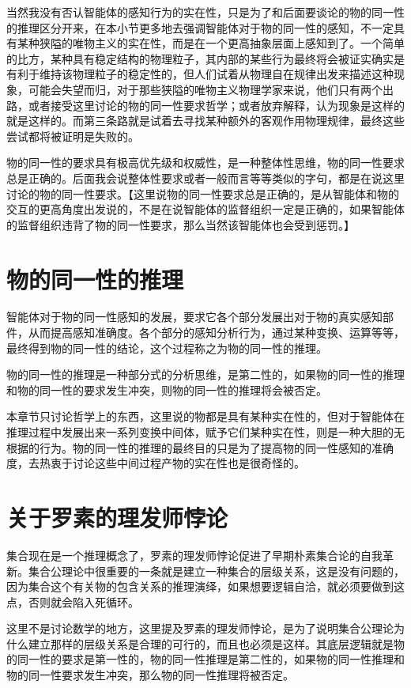 \documentclass[12pt,oneside]{book}
\begin{document}
当然我没有否认智能体的感知行为的实在性，只是为了和后面要谈论的物的同一性的推理区分开来，在本小节更多地去强调智能体对于物的同一性的感知，不一定具有某种狭隘的唯物主义的实在性，而是在一个更高抽象层面上感知到了。一个简单的比方，某种具有稳定结构的物理粒子，其内部的某些行为最终将会被证实确实是有利于维持该物理粒子的稳定性的，但人们试着从物理自在规律出发来描述这种现象，可能会失望而归，对于那些狭隘的唯物主义物理学家来说，他们只有两个出路，或者接受这里讨论的物的同一性要求哲学；或者放弃解释，认为现象是这样的就是这样的。而第三条路就是试着去寻找某种额外的客观作用物理规律，最终这些尝试都将被证明是失败的。

物的同一性的要求具有极高优先级和权威性，是一种整体性思维，物的同一性要求总是正确的。后面我会说整体性要求或者一般而言等等类似的字句，都是在说这里讨论的物的同一性要求。【这里说物的同一性要求总是正确的，是从智能体和物的交互的更高角度出发说的，不是在说智能体的监督组织一定是正确的，如果智能体的监督组织违背了物的同一性要求，那么当然该智能体也会受到惩罚。】


\section{物的同一性的推理}
智能体对于物的同一性感知的发展，要求它各个部分发展出对于物的真实感知部件，从而提高感知准确度。各个部分的感知分析行为，通过某种变换、运算等等，最终得到物的同一性的结论，这个过程称之为物的同一性的推理。

物的同一性的推理是一种部分式的分析思维，是第二性的，如果物的同一性的推理和物的同一性的要求发生冲突，则物的同一性的推理将会被否定。

本章节只讨论哲学上的东西，这里说的物都是具有某种实在性的，但对于智能体在推理过程中发展出来一系列变换中间体，赋予它们某种实在性，则是一种大胆的无根据的行为。物的同一性的推理的最终目的只是为了提高物的同一性感知的准确度，去热衷于讨论这些中间过程产物的实在性也是很奇怪的。

\section{关于罗素的理发师悖论}
集合现在是一个推理概念了，罗素的理发师悖论促进了早期朴素集合论的自我革新。集合公理论中很重要的一条就是建立一种集合的层级关系，这是没有问题的，因为集合这个有关物的包含关系的推理演绎，如果想要逻辑自洽，就必须要做到这点，否则就会陷入死循环。

这里不是讨论数学的地方，这里提及罗素的理发师悖论，是为了说明集合公理论为什么建立那样的层级关系是合理的可行的，而且也必须是这样。其底层逻辑就是物的同一性的要求是第一性的，物的同一性推理是第二性的，如果物的同一性推理和物的同一性要求发生冲突，那么物的同一性推理将被否定。
\end{document}
